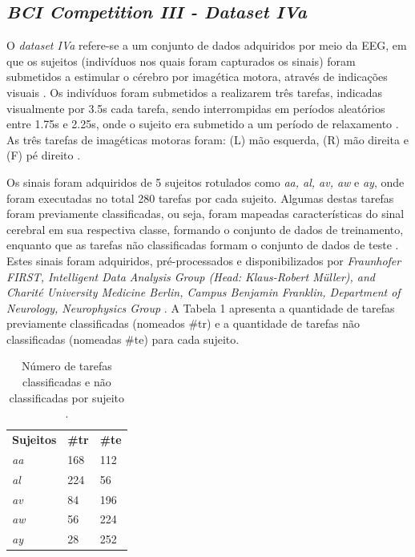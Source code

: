 \subsection{\textit{BCI Competition III - Dataset IVa}}
O \textit{dataset IVa} refere-se a um conjunto de dados adquiridos por meio da EEG, em que os sujeitos (indivíduos nos quais foram capturados os sinais) foram submetidos a estimular o cérebro por imagética motora, através de indicações visuais \cite{BCICompetition}. Os indivíduos foram submetidos a realizarem três tarefas, indicadas visualmente por 3.5s cada tarefa, sendo interrompidas em períodos aleatórios entre 1.75s e 2.25s, onde o sujeito era submetido a um período de relaxamento \cite{BCICompetition}. As três tarefas de imagéticas motoras foram: (L) mão esquerda, (R) mão direita e (F) pé direito \cite{BCICompetition}.

Os sinais foram adquiridos de 5 sujeitos rotulados como \textit{aa, al, av, aw} e \textit{ay}, onde foram executadas no total 280 tarefas por cada sujeito. Algumas destas tarefas foram previamente classificadas, ou seja, foram mapeadas características do sinal cerebral em sua respectiva classe, formando o conjunto de dados de treinamento, enquanto que as tarefas não classificadas formam o conjunto de dados de teste \cite{siteBCI}. Estes sinais foram adquiridos, pré-processados e disponibilizados por \textit{Fraunhofer FIRST, Intelligent Data Analysis Group (Head: Klaus-Robert Müller), and Charité University Medicine Berlin, Campus Benjamin Franklin, Department of Neurology, Neurophysics Group} \cite{BCICompetition}. A Tabela 1 apresenta a quantidade de tarefas previamente classificadas (nomeados \#tr) e a quantidade de tarefas não classificadas (nomeadas \#te) para cada sujeito.

\begin{table}[h!]
	\centering
	\caption{Número de tarefas classificadas e não classificadas por sujeito \cite{BCICompetition}.}
	\label{my-label}
	\begin{tabular}{lll}
		\textbf{Sujeitos} & \textbf{\#tr} & \textbf{\#te} \\
		\textit{aa} & 168 & 112 \\
		\textit{al} & 224 & 56 \\
		\textit{av} & 84 & 196 \\
		\textit{aw} & 56 & 224 \\
		\textit{ay} & 28 & 252
	\end{tabular}
\end{table}
 
